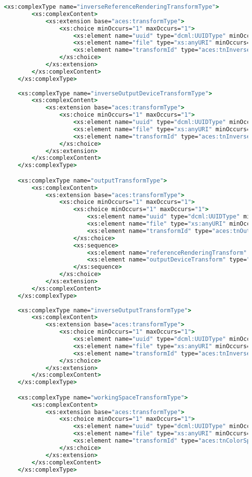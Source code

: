 \begin{lstlisting}[language=csh]
	<xs:complexType name="inverseReferenceRenderingTransformType">
		<xs:complexContent>
			<xs:extension base="aces:transformType">
				<xs:choice minOccurs="1" maxOccurs="1">
					<xs:element name="uuid" type="dcml:UUIDType" minOccurs="1" maxOccurs="1"/>
					<xs:element name="file" type="xs:anyURI" minOccurs="1" maxOccurs="1"/>
					<xs:element name="transformId" type="aces:tnInverseReferenceRenderingTransform" minOccurs="1" maxOccurs="1"/>
				</xs:choice>
			</xs:extension>
		</xs:complexContent>
	</xs:complexType>
	
	<xs:complexType name="inverseOutputDeviceTransformType">
		<xs:complexContent>
			<xs:extension base="aces:transformType">
				<xs:choice minOccurs="1" maxOccurs="1">
					<xs:element name="uuid" type="dcml:UUIDType" minOccurs="1" maxOccurs="1"/>
					<xs:element name="file" type="xs:anyURI" minOccurs="1" maxOccurs="1"/>
					<xs:element name="transformId" type="aces:tnInverseOutputDeviceTransform" minOccurs="1" maxOccurs="1"/>
				</xs:choice>
			</xs:extension>
		</xs:complexContent>
	</xs:complexType>

	<xs:complexType name="outputTransformType">
		<xs:complexContent>
			<xs:extension base="aces:transformType">
				<xs:choice minOccurs="1" maxOccurs="1">
					<xs:choice minOccurs="1" maxOccurs="1">
						<xs:element name="uuid" type="dcml:UUIDType" minOccurs="1" maxOccurs="1"/>
						<xs:element name="file" type="xs:anyURI" minOccurs="1" maxOccurs="1"/>
						<xs:element name="transformId" type="aces:tnOutputTransform" minOccurs="1" maxOccurs="1"/>
					</xs:choice>
					<xs:sequence>
						<xs:element name="referenceRenderingTransform" type="aces:referenceRenderingTransformType" minOccurs="1" maxOccurs="1"/>
						<xs:element name="outputDeviceTransform" type="aces:outputDeviceTransformType" minOccurs="1" maxOccurs="1"/>
					</xs:sequence>
				</xs:choice>
			</xs:extension>
		</xs:complexContent>
	</xs:complexType>
	
	<xs:complexType name="inverseOutputTransformType">
		<xs:complexContent>
			<xs:extension base="aces:transformType">
				<xs:choice minOccurs="1" maxOccurs="1">
					<xs:element name="uuid" type="dcml:UUIDType" minOccurs="1" maxOccurs="1"/>
					<xs:element name="file" type="xs:anyURI" minOccurs="1" maxOccurs="1"/>
					<xs:element name="transformId" type="aces:tnInverseOutputTransform" minOccurs="1" maxOccurs="1"/>
				</xs:choice>
			</xs:extension>
		</xs:complexContent>
	</xs:complexType>

	<xs:complexType name="workingSpaceTransformType">
		<xs:complexContent>
			<xs:extension base="aces:transformType">
				<xs:choice minOccurs="1" maxOccurs="1">
					<xs:element name="uuid" type="dcml:UUIDType" minOccurs="1" maxOccurs="1"/>
					<xs:element name="file" type="xs:anyURI" minOccurs="1" maxOccurs="1"/>
					<xs:element name="transformId" type="aces:tnColorSpaceConversionTransform" minOccurs="1" maxOccurs="1"/>
				</xs:choice>
			</xs:extension>
		</xs:complexContent>
	</xs:complexType>


\end{lstlisting}
